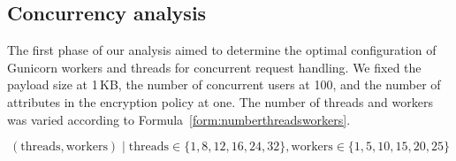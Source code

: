 \documentclass[cic,tc,english]{iiufrgs}
\begin{document}
            




        \subsection{Concurrency analysis}
        \label{subsec:phase1_concurrency}

        The first phase of our analysis aimed to determine the optimal configuration of Gunicorn workers and threads for concurrent request handling. We fixed the payload size at 1\,KB, the number of concurrent users at 100, and the number of attributes in the encryption policy at one. The number of threads and workers was varied according to Formula~\ref{form:numberthreadsworkers}.

        \begin{equation}
            \label{form:numberthreadsworkers}
            (\text{threads}, \text{workers}) \mid \text{threads} \in \{1, 8, 12, 16, 24, 32\}, \text{workers} \in \{1, 5, 10, 15, 20, 25\} 
        \end{equation}
\end{document}
